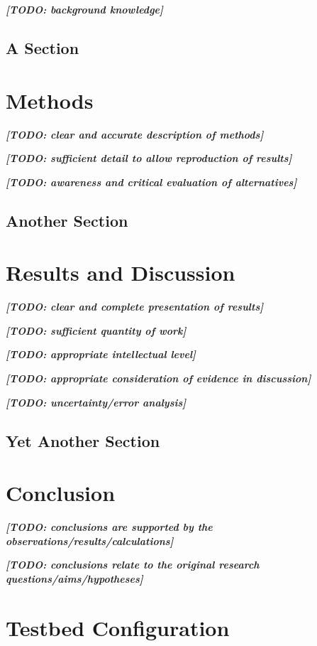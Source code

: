 \documentclass[11pt,twoside]{report}
\newcommand{\remark}[1]{{\bf \em [\marginpar{$\Leftarrow$}#1]}}
\begin{document}
\remark{TODO: background knowledge}

\section{A Section}

\chapter{Methods}

\remark{TODO: clear and accurate description of methods}

\remark{TODO: sufficient detail to allow reproduction of results}

\remark{TODO: awareness and critical evaluation of alternatives}

\section{Another Section}

\chapter{Results and Discussion}

\remark{TODO: clear and complete presentation of results}

\remark{TODO: sufficient quantity of work}

\remark{TODO: appropriate intellectual level}

\remark{TODO: appropriate consideration of evidence in discussion}

\remark{TODO: uncertainty/error analysis}

\section{Yet Another Section}

\chapter{Conclusion}

\remark{TODO: conclusions are supported by the observations/results/calculations}

\remark{TODO: conclusions relate to the original research questions/aims/hypotheses}

\appendix
\chapter{Testbed Configuration}

\cleardoublepage


\end{document}
